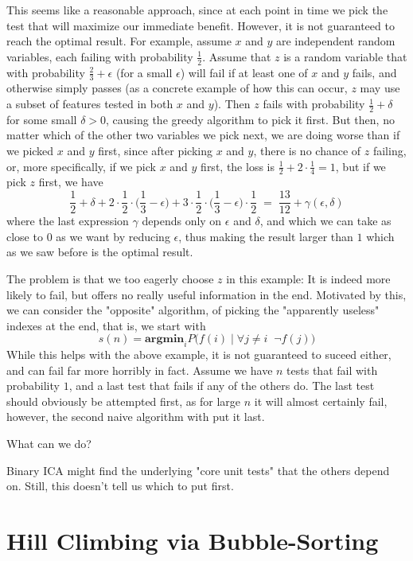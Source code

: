\documentclass[12pt]{article}
\begin{document}
This seems like a reasonable approach, since at each point in time we pick the test that will maximize our immediate benefit. However, it is not guaranteed to reach the optimal result. For example, assume $x$ and $y$ are independent random variables, each failing with probability $\frac{1}{2}$. Assume that $z$ is a random variable that with probability $\frac{2}{3} + \epsilon$ (for a small $\epsilon$) will fail if at least one of $x$ and $y$ fails, and otherwise simply passes (as a concrete example of how this can occur, $z$ may use a subset of features tested in both $x$ and $y$). Then $z$ fails with probability $\frac{1}{2} + \delta$ for some small $\delta>0$, causing the greedy algorithm to pick it first. But then, no matter which of the other two variables we pick next, we are doing worse than if we picked $x$ and $y$ first, since after picking $x$ and $y$, there is no chance of $z$ failing, or, more specifically, if we pick $x$ and $y$ first, the loss is $\frac{1}{2} + 2 \cdot \frac{1}{4} = 1$, but if we pick $z$ first, we have
\[ \frac{1}{2} + \delta + 2 \cdot \frac{1}{2} \cdot \Bigg( \frac{1}{3} - \epsilon \Bigg) + 3 \cdot \frac{1}{2} \cdot \Bigg( \frac{1}{3} - \epsilon \Bigg) \cdot \frac{1}{2}
\; = \;
\frac{13}{12} + \gamma(\epsilon, \delta)\]
where the last expression $\gamma$ depends only on $\epsilon$ and $\delta$, and which we can take as close to $0$ as we want by reducing $\epsilon$, thus making the result larger than $1$ which as we saw before is the optimal result.

The problem is that we too eagerly choose $z$ in this example: It is indeed more likely to fail, but offers no really useful information in the end. Motivated by this, we can consider the "opposite" algorithm, of picking the "apparently useless" indexes at the end, that is, we start with
\[ s(n) = \textbf{argmin}_{i} P\Big(f(i) \; \Big| \; \forall j \neq i \;\; \neg f(j) \Big) \]
While this helps with the above example, it is not guaranteed to suceed either, and can fail far more horribly in fact. Assume we have $n$ tests that fail with probability $1$, and a last test that fails if any of the others do. The last test should obviously be attempted first, as for large $n$ it will almost certainly fail, however, the second naive algorithm with put it last.

What can we do?

Binary ICA might find the underlying "core unit tests" that the others depend on. Still, this doesn't tell us which to put first.

\section{Hill Climbing via Bubble-Sorting}
\end{document}
